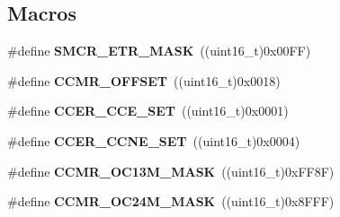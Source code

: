 \subsection*{Macros}
\begin{DoxyCompactItemize}
\item 
\mbox{\label{group___t_i_m_ga705d4e8fca08b32bfd20592dea164447}} 
\#define {\bfseries S\+M\+C\+R\+\_\+\+E\+T\+R\+\_\+\+M\+A\+SK}~((uint16\+\_\+t)0x00\+F\+F)
\item 
\mbox{\label{group___t_i_m_ga110aacc88d798c51d324cb360c62c538}} 
\#define {\bfseries C\+C\+M\+R\+\_\+\+O\+F\+F\+S\+ET}~((uint16\+\_\+t)0x0018)
\item 
\mbox{\label{group___t_i_m_gac721c0fff405ca1dc4bfe9c84868e928}} 
\#define {\bfseries C\+C\+E\+R\+\_\+\+C\+C\+E\+\_\+\+S\+ET}~((uint16\+\_\+t)0x0001)
\item 
\mbox{\label{group___t_i_m_ga82e4fa29e85adee9247914e00323fe34}} 
\#define {\bfseries C\+C\+E\+R\+\_\+\+C\+C\+N\+E\+\_\+\+S\+ET}~((uint16\+\_\+t)0x0004)
\item 
\mbox{\label{group___t_i_m_ga56a11432b4408650479f5c19dbbafbc8}} 
\#define {\bfseries C\+C\+M\+R\+\_\+\+O\+C13\+M\+\_\+\+M\+A\+SK}~((uint16\+\_\+t)0x\+F\+F8\+F)
\item 
\mbox{\label{group___t_i_m_gabd4e5a88e8b7c9dbd068bbfd9f0e6ed2}} 
\#define {\bfseries C\+C\+M\+R\+\_\+\+O\+C24\+M\+\_\+\+M\+A\+SK}~((uint16\+\_\+t)0x8\+F\+F\+F)
\end{DoxyCompactItemize}
